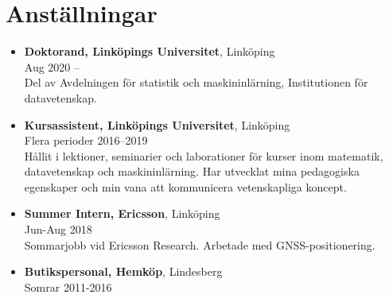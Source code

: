 \documentclass[12pt]{article}
\newcommand{\text}[2]{#2}
\newcommand{\text}[2]{#1}
\begin{document}
\section*{\text{Employment}{Anställningar}}
\begin{itemize}
    \item \textbf{\text{PhD Student, Linköping University}{Doktorand, Linköpings Universitet}}, Linköping\\
    Aug 2020 --\\
    \text{Part of the Division of Statistics and Machine Learning, Department of Computer and Information Science.}{Del av Avdelningen för statistik och maskininlärning, Institutionen för datavetenskap.}

    \newpage
    \item \textbf{\text{Teaching Assistant, Linköping University}{Kursassistent, Linköpings Universitet}}, Linköping\\
        \text{Multiple periods}{Flera perioder} 2016--2019\\
        \text{
            Held lessons, seminars and lab-sessions for courses in mathematics, computer science and machine learning. Developed my teaching skills and my ability to communicate scientific concepts.
        }{
            Hållit i lektioner, seminarier och laborationer för kurser inom matematik, datavetenskap och maskininlärning. Har utvecklat mina pedagogiska egenskaper och min vana att kommunicera vetenskapliga koncept.
        }
    \item \textbf{Summer Intern, Ericsson}, Linköping\\
        Jun-Aug 2018\\
        \text{
            Summer internship at Ericsson Research. Worked with GNSS positioning.
        }{
            Sommarjobb vid Ericsson Research. Arbetade med GNSS-positionering.
        }

    \item \textbf{\text{Store Clerk}{Butikspersonal}, Hemköp}, Lindesberg\\
        \text{Summers}{Somrar} 2011-2016
\end{itemize}
\end{document}

